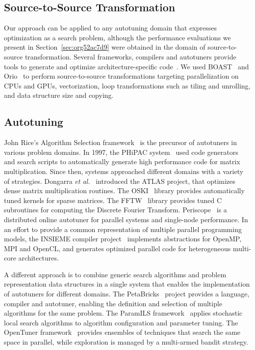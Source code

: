 \documentclass[conference]{IEEEtran}
\begin{document}
\subsection{Source-to-Source Transformation}
\label{sec:org9a35410}
Our approach can be applied to any autotuning domain that expresses optimization
as a search problem, although the performance evaluations we present in
Section~\ref{sec:org52ac7d9} were obtained in the domain of
source-to-source transformation. Several frameworks, compilers and autotuners
provide tools to generate and optimize architecture-specific
code~\cite{hartono2009annotation,videau2017boast,tiwari2009scalable,yi2007poet,ansel2009petabricks}.
We used BOAST~\cite{videau2017boast} and
Orio~\cite{hartono2009annotation} to perform source-to-source
transformations targeting parallelization on CPUs and GPUs, vectorization, loop
transformations such as tiling and unrolling, and data structure size and
copying.
\subsection{Autotuning}
\label{sec:org5a1f84c}
John Rice's Algorithm Selection framework~\cite{rice1976algorithm} is the
precursor of autotuners in various problem domains. In 1997, the PHiPAC
system~\cite{bilmes1997optimizing} used code generators and search scripts
to automatically generate high performance code for matrix multiplication. Since
then, systems approached different domains with a variety of strategies.
Dongarra \emph{et al.}~\cite{dongarra1998automatically} introduced the ATLAS
project, that optimizes dense matrix multiplication routines. The
OSKI~\cite{vuduc2005oski} library provides automatically tuned kernels for
sparse matrices. The FFTW~\cite{frigo1998fftw} library provides tuned C
subroutines for computing the Discrete Fourier Transform.
Periscope~\cite{gerndt2010automatic} is a distributed online autotuner for
parallel systems and single-node performance. In an effort to provide a common
representation of multiple parallel programming models, the INSIEME compiler
project~\cite{jordan2012multi} implements abstractions for OpenMP, MPI and
OpenCL, and generates optimized parallel code for heterogeneous multi-core
architectures.

A different approach is to combine generic search algorithms and problem
representation data structures in a single system that enables the
implementation of autotuners for different domains. The
PetaBricks~\cite{ansel2009petabricks} project provides a language,
compiler and autotuner, enabling the definition and selection of multiple
algorithms for the same problem. The ParamILS
framework~\cite{hutter2009paramils} applies stochastic local search
algorithms to algorithm configuration and parameter tuning. The OpenTuner
framework~\cite{ansel2014opentuner} provides ensembles of techniques that
search the same space in parallel, while exploration is managed by a multi-armed
bandit strategy.
\end{document}
